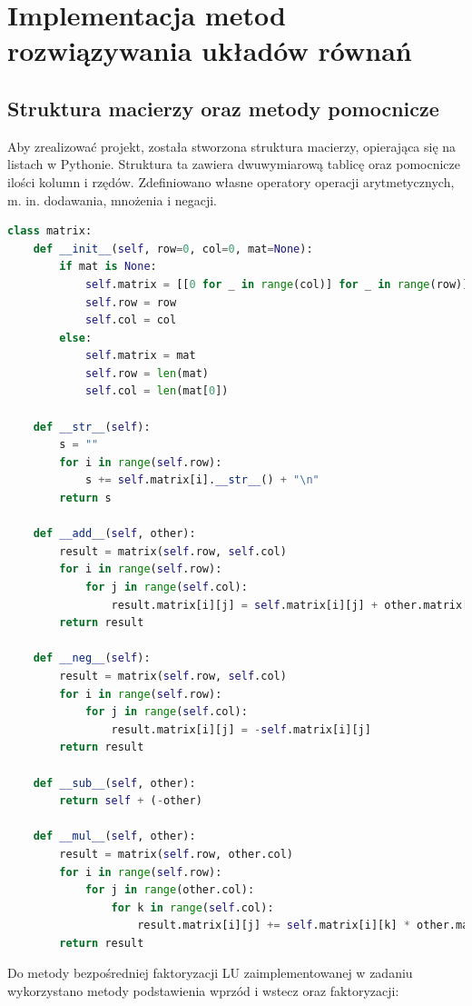 \documentclass{article}
\begin{document}
\section{Implementacja metod rozwiązywania układów równań}

\subsection{Struktura macierzy oraz metody pomocnicze}

Aby zrealizować projekt, została stworzona struktura macierzy, opierająca się na listach w Pythonie. Struktura ta zawiera dwuwymiarową tablicę oraz pomocnicze ilości kolumn i rzędów. Zdefiniowano własne operatory operacji arytmetycznych, m. in. dodawania, mnożenia i negacji.

\vspace{0.75em}
\begin{lstlisting}[language=Python, caption=Definicja klasy \texttt{matrix}]
class matrix:
    def __init__(self, row=0, col=0, mat=None):
        if mat is None:
            self.matrix = [[0 for _ in range(col)] for _ in range(row)]
            self.row = row
            self.col = col
        else:
            self.matrix = mat
            self.row = len(mat)
            self.col = len(mat[0])

    def __str__(self):
        s = ""
        for i in range(self.row):
            s += self.matrix[i].__str__() + "\n"
        return s

    def __add__(self, other):
        result = matrix(self.row, self.col)
        for i in range(self.row):
            for j in range(self.col):
                result.matrix[i][j] = self.matrix[i][j] + other.matrix[i][j]
        return result

    def __neg__(self):
        result = matrix(self.row, self.col)
        for i in range(self.row):
            for j in range(self.col):
                result.matrix[i][j] = -self.matrix[i][j]
        return result

    def __sub__(self, other):
        return self + (-other)

    def __mul__(self, other):
        result = matrix(self.row, other.col)
        for i in range(self.row):
            for j in range(other.col):
                for k in range(self.col):
                    result.matrix[i][j] += self.matrix[i][k] * other.matrix[k][j]
        return result
\end{lstlisting}
\newpage

Do metody bezpośredniej faktoryzacji LU zaimplementowanej w zadaniu wykorzystano metody podstawienia wprzód i wstecz oraz faktoryzacji:
\end{document}
